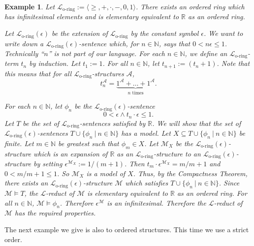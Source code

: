 \documentclass[11pt]{article}
\newtheorem{example}[theorem]{Example}
\newcommand{\mcal}[1]{\mathcal{#1}}
\newcommand{\R}{\mathbb{R}}
\newcommand{\N}{\mathbb{N}}
\newcommand{\st}{\ \vert \ }
\begin{document}
\begin{example}
Let $\mcal{L}_{\text{o-ring}}:=\langle \geq, +,\cdot,-,0,1\rangle$. There exists an ordered ring which has infinitesimal elements and is elementary equivalent to $\R$ as an ordered ring.

Let $\mcal{L}_{\text{o-ring}}(\epsilon)$ be the extension of $\mcal{L}_{\text{o-ring}}$ by the constant symbol $\epsilon$. We want to write down a $\mcal{L}_{\text{o-ring}}(\epsilon)$-sentence which, for $n\in \N$, says that $0<n\epsilon\leq 1$. Technically ``$n$'' is not part of our language. For each $n\in\N$, we define an $\mcal{L}_{\text{o-ring}}$-term $t_n$ by induction. Let $t_1:=1$. For all $n\in\N$, let $t_{n+1}:=(t_n+1)$. Note that this means that for all $\mcal{L}_{\text{o-ring}}$-structures $\mcal{A}$,
\[t_n^{\mcal{A}}=\underbrace{1^{\mcal{A}}+\ldots+1^{\mcal{A}}}_{n\text{ times}}.\]

For each $n\in\N$, let $\phi_n$ be the $\mcal{L}_{\text{o-ring}}(\epsilon)$-sentence
\[0< \epsilon\wedge t_n\cdot\epsilon\leq 1. \] Let $T$ be the set of $\mcal{L}_{\text{o-ring}}$-sentences satisfied by $\R$. We will show that the set of $\mcal{L}_{\text{o-ring}}(\epsilon)$-sentences $T\cup\{\phi_n\st n\in\N\}$ has a model. Let $X\subseteq T\cup\{\phi_n\st n\in\N\}$ be finite. Let $m\in\N$ be greatest such that $\phi_m\in X$. Let $\mcal{M}_X$ be the $\mcal{L}_{\text{o-ring}}(\epsilon)$-structure which is an expansion of $\R$ as an $\mcal{L}_{\text{o-ring}}$-structure to an $\mcal{L}_{\text{o-ring}}(\epsilon)$-structure by setting $\epsilon^{\mcal{M}_X}:=1/(m+1)$. Then $t_m\cdot\epsilon^{\mcal{M}_X}=m/m+1$ and $0<m/m+1\leq 1$. So $\mcal{M}_X$ is a model of $X$. Thus, by the Compactness Theorem, there exists an $\mcal{L}_{\text{o-ring}}(\epsilon)$-structure $\mcal{M}$ which satisfies $T\cup\{\phi_n\st n\in\N\}$. Since $\mcal{M}\models T$, the $\mcal{L}$-reduct of $\mcal{M}$ is elementary equivalent to $\R$ as an ordered ring. For all $n\in\N$, $\mcal{M}\models \phi_n$. Therefore $\epsilon^\mcal{M}$ is an infinitesimal. Therefore the $\mcal{L}$-reduct of $\mcal{M}$ has the required properties.
\end{example}

The next example we give is also to ordered structures. This time we use a strict order.
\end{document}
